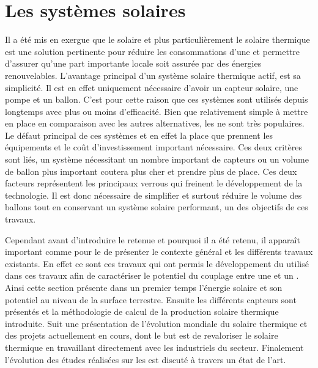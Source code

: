 \section{Les systèmes solaires} %
\label{sec:les_systemes_solaires}
Il a été mis en exergue que le solaire et plus particulièrement le solaire thermique est
une solution pertinente pour réduire les consommations d’une  et permettre
d’assurer qu’une part importante locale soit assurée par des énergies renouvelables.
L’avantage principal d’un système solaire thermique actif, est sa simplicité. Il est en
effet uniquement nécessaire d’avoir un capteur solaire, une pompe et un ballon. C’est pour
cette raison que ces systèmes sont utilisés depuis longtemps avec plus ou moins
d’efficacité. Bien que relativement simple à mettre en place en comparaison avec les
autres alternatives, les  ne sont très populaires. Le défaut principal de ces
systèmes et en effet la place que prennent les équipements et le coût d’investissement
important nécessaire. Ces deux critères sont liés, un système nécessitant un nombre
important de capteurs ou un volume de ballon plus important coutera plus cher et prendre
plus de place. Ces deux facteurs représentent les principaux verrous qui freinent le
développement de la technologie. Il est donc nécessaire de simplifier et surtout réduire
le volume des ballons tout en conservant un système solaire performant, un des objectifs
de ces travaux.

Cependant avant d’introduire le  retenue et pourquoi il a été retenu, il apparaît
important comme pour le  de présenter le contexte général et les différents
travaux existants. En effet ce sont ces travaux qui ont permis le développement du
 utilisé dans ces travaux afin de caractériser le potentiel du couplage entre une
 et un . Ainsi cette section présente dans un premier temps l’énergie
solaire et son potentiel au niveau de la surface terrestre. Ensuite les différents
capteurs sont présentés et la méthodologie de calcul de la production solaire thermique
introduite. Suit une présentation de l’évolution mondiale du solaire thermique et des
projets actuellement en cours, dont le but est de revaloriser le solaire thermique en
travaillant directement avec les industriels du secteur. Finalement l’évolution des études
réalisées sur les  est discuté à travers un état de l’art.


